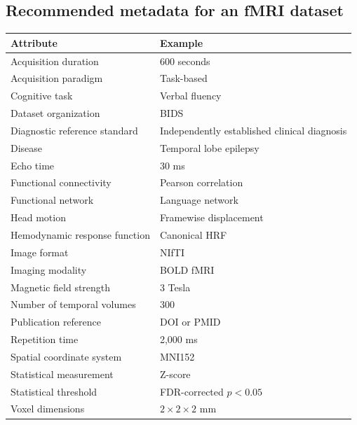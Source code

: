 \subsection{Recommended metadata for an fMRI dataset}
\begin{longtable}{@{}p{}p{}@{}}
\toprule
\textbf{Attribute} & \textbf{Example} \\
\midrule
Acquisition duration & 600 seconds \\
Acquisition paradigm & Task-based \\
Cognitive task & Verbal fluency \\
Dataset organization & BIDS \\
Diagnostic reference standard & Independently established clinical diagnosis \\
Disease & Temporal lobe epilepsy \\
Echo time & 30 ms \\
Functional connectivity & Pearson correlation \\
Functional network & Language network \\
Head motion & Framewise displacement \\
Hemodynamic response function & Canonical HRF \\
Image format & NIfTI \\
Imaging modality & BOLD fMRI \\
Magnetic field strength & 3 Tesla \\
Number of temporal volumes & 300 \\
Publication reference & DOI or PMID \\
Repetition time & 2,000 ms \\
Spatial coordinate system & MNI152 \\
Statistical measurement & Z-score \\
Statistical threshold & FDR-corrected $p < 0.05$ \\
Voxel dimensions & $2 \times 2 \times 2$ mm \\
\bottomrule
\end{longtable}

